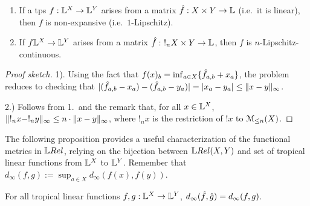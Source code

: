 \begin{proposition}\label{prop:troplinear}
\begin{enumerate}
\item If a tps $f: \mathbb{L}^{X}\to \mathbb{L}^{Y}$ arises from a matrix $\hat{f}:X\times Y\to \mathbb{L}$ (i.e.~it is linear), then $f$ is non-expansive (i.e.\ $1$-Lipschitz).  
\item If  $f \mathbb{L}^{X}\to \mathbb{L}^{Y}$ arises from a matrix $\hat{f}: \ !_{n}X\times Y\to \mathbb{L}$, then $f$ is $n$-Lipschitz-continuous.
\end{enumerate}
\end{proposition}
\begin{proof}[Proof sketch]
1). Using the fact that $f( x)_{b}= \inf_{a\in X}\{\hat{f}_{a,b}+ x_{a}\}$,
the problem reduces to checking that $|(\hat{f}_{a,b}- x_{a})- (\hat{f}_{a,b}- y_{a})| = |x_{a}- y_{a}|\leq \|  x- y\|_{\infty}$.

2.) Follows from 1.~and the remark that, for all $x\in \mathbb{L}^{X}$, $\lVert !_{n} x-!_{n} y\rVert_{\infty}\leq n\cdot \lVert x- y\rVert_{\infty}$, where $!_{n} x$ is the restriction of $! x$ to $\mathcal{M}_{\leq n}(X)$.%
\end{proof} 

The following proposition provides a useful characterization of the functional metrics in $\LREL$, relying on 
the bijection between $\HOM{\LREL}{X}{Y}$ and set of tropical linear functions from $\mathbb{L}^{X}$ to $\mathbb{L}^{Y}$.
Remember that $d_\infty(f,g):=\sup_{a\in X} d_\infty(f(x),f(y))$.

\begin{proposition}
For all tropical linear functions $f,g:\mathbb{L}^{X}\to \mathbb{L}^{Y}$, $d_{\infty}(\hat{f},\hat{g})=d_\infty(f,g)$.%
\end{proposition}

